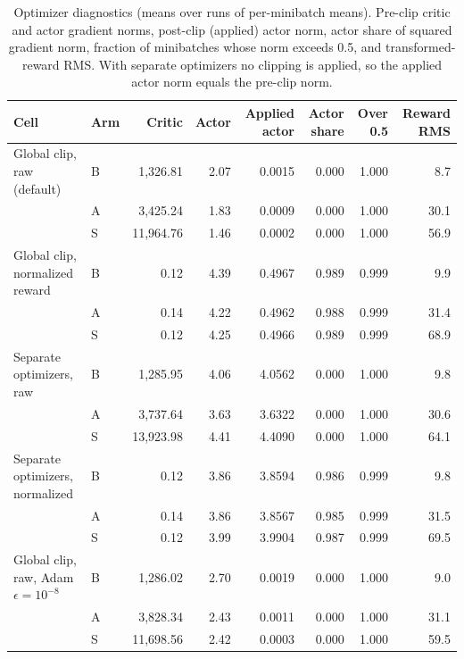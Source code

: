 \begin{table}[H]
\caption{Optimizer diagnostics (means over runs of per-minibatch means). Pre-clip critic and actor gradient norms, post-clip (applied) actor norm, actor share of squared gradient norm, fraction of minibatches whose norm exceeds 0.5, and transformed-reward RMS. With separate optimizers no clipping is applied, so the applied actor norm equals the pre-clip norm.}
\label{tab:factorial_diagnostics}
\centering\scriptsize
\begin{tabular}{@{}llrrrrrr@{}}
\toprule
Cell & Arm & Critic & Actor & Applied actor & Actor share & Over 0.5 & Reward RMS \\
\midrule
Global clip, raw (default) & B & 1,326.81 & 2.07 & 0.0015 & 0.000 & 1.000 & 8.7 \\
 & A & 3,425.24 & 1.83 & 0.0009 & 0.000 & 1.000 & 30.1 \\
 & S & 11,964.76 & 1.46 & 0.0002 & 0.000 & 1.000 & 56.9 \\
Global clip, normalized reward & B & 0.12 & 4.39 & 0.4967 & 0.989 & 0.999 & 9.9 \\
 & A & 0.14 & 4.22 & 0.4962 & 0.988 & 0.999 & 31.4 \\
 & S & 0.12 & 4.25 & 0.4966 & 0.989 & 0.999 & 68.9 \\
Separate optimizers, raw & B & 1,285.95 & 4.06 & 4.0562 & 0.000 & 1.000 & 9.8 \\
 & A & 3,737.64 & 3.63 & 3.6322 & 0.000 & 1.000 & 30.6 \\
 & S & 13,923.98 & 4.41 & 4.4090 & 0.000 & 1.000 & 64.1 \\
Separate optimizers, normalized & B & 0.12 & 3.86 & 3.8594 & 0.986 & 0.999 & 9.8 \\
 & A & 0.14 & 3.86 & 3.8567 & 0.985 & 0.999 & 31.5 \\
 & S & 0.12 & 3.99 & 3.9904 & 0.987 & 0.999 & 69.5 \\
Global clip, raw, Adam $\epsilon{=}10^{-8}$ & B & 1,286.02 & 2.70 & 0.0019 & 0.000 & 1.000 & 9.0 \\
 & A & 3,828.34 & 2.43 & 0.0011 & 0.000 & 1.000 & 31.1 \\
 & S & 11,698.56 & 2.42 & 0.0003 & 0.000 & 1.000 & 59.5 \\
\bottomrule
\end{tabular}
\end{table}
